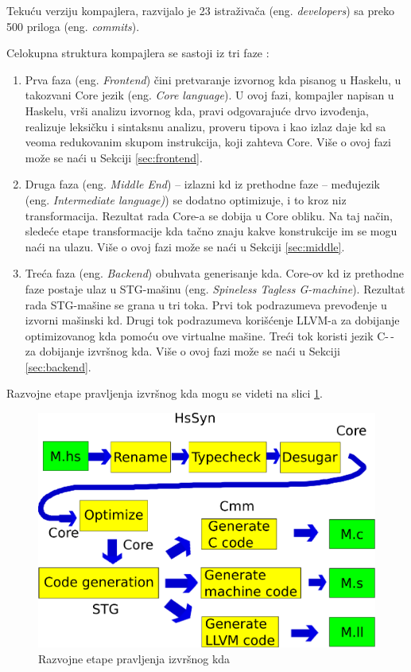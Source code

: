 Tekuću verziju kompajlera, razvijalo je 23 istraživača (eng. \emph{developers}) sa preko 500 priloga (eng. \emph {commits}).

Celokupna struktura kompajlera se sastoji iz tri faze :
\begin{enumerate}
	\item Prva faza (eng. \emph{Frontend}) čini pretvaranje izvornog kda pisanog u Haskelu, u takozvani Core jezik (eng. \emph {Core language}). U ovoj fazi, kompajler napisan u Haskelu, vrši analizu izvornog kda, pravi odgovarajuće drvo izvođenja, realizuje leksičku i sintaksnu analizu, proveru tipova i kao izlaz daje kd sa veoma redukovanim skupom instrukcija, koji zahteva Core. Više o ovoj fazi može se naći u Sekciji \ref{sec:frontend}.
	\item Druga faza (eng. \emph {Middle End}) – izlazni kd iz prethodne faze – međujezik (eng. \emph {Intermediate language)}) se dodatno optimizuje, i to kroz niz transformacija. Rezultat rada Core-a se dobija u Core obliku. Na taj način, sledeće etape transformacije kda tačno znaju kakve konstrukcije im se mogu naći na ulazu.  Više o ovoj fazi može se naći u Sekciji \ref{sec:middle}.
	\item Treća faza (eng. \emph {Backend}) obuhvata generisanje kda. Core-ov kd iz prethodne faze postaje ulaz u STG-mašinu (eng. \emph {Spineless Tagless G-machine}). Rezultat rada STG-mašine se grana u tri toka. Prvi tok podrazumeva prevođenje u izvorni mašinski kd. Drugi tok podrazumeva korišćenje LLVM-a za dobijanje optimizovanog kda pomoću ove virtualne mašine. Treći tok koristi jezik C-\,- za dobijanje izvršnog kda. Više o ovoj fazi može se naći u Sekciji \ref{sec:backend}.
\end{enumerate}

Razvojne etape pravljenja izvršnog kda mogu se videti na slici \ref{fig:razvojneEtaple}.

\begin{figure}[h!]
	\begin{center}
		\includegraphics[scale=0.30]{resources/razvojneEtape.png}
	\end{center}
	\caption{Razvojne etape pravljenja izvršnog kda}
	\label{fig:razvojneEtaple}
\end{figure}